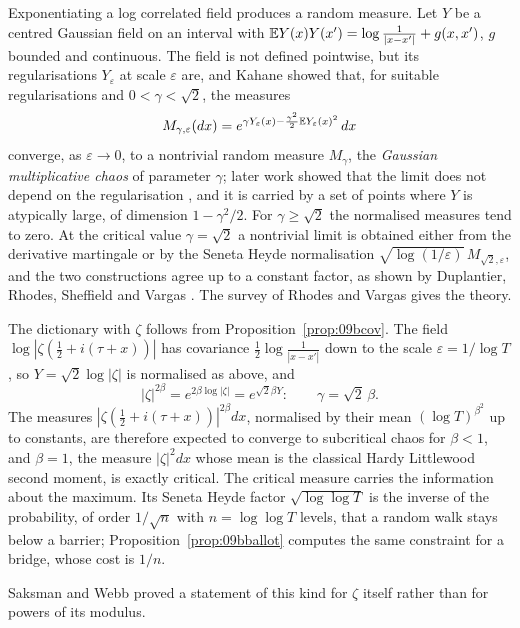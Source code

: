 Exponentiating a log correlated field produces a random measure. Let $Y$ be a centred Gaussian field on an interval with $\mathbb{E} Y(x)Y(x')=\log\frac{1}{|x-x'|}+g(x,x')$, $g$ bounded and continuous. The field is not defined pointwise, but its regularisations $Y_\varepsilon$ at scale $\varepsilon$ are, and Kahane \cite{kahane1985} showed that, for suitable regularisations and $0<\gamma<\sqrt2$, the measures
\[
M_{\gamma,\varepsilon}(dx)=e^{\gamma Y_\varepsilon(x)-\frac{\gamma^2}2\mathbb{E} Y_\varepsilon(x)^2}\,dx
\]
converge, as $\varepsilon\to0$, to a nontrivial random measure $M_\gamma$, the \emph{Gaussian multiplicative chaos} of parameter $\gamma$; later work showed that the limit does not depend on the regularisation \cite{rhodesvargas2014}, and it is carried by a set of points where $Y$ is atypically large, of dimension $1-\gamma^2/2$. For $\gamma\ge\sqrt2$ the normalised measures tend to zero. At the critical value $\gamma=\sqrt2$ a nontrivial limit is obtained either from the derivative martingale or by the Seneta Heyde normalisation $\sqrt{\log(1/\varepsilon)}\,M_{\sqrt2,\varepsilon}$, and the two constructions agree up to a constant factor, as shown by Duplantier, Rhodes, Sheffield and Vargas \cite{dsrv2014,dsrv2014b}. The survey of Rhodes and Vargas \cite{rhodesvargas2014} gives the theory.

The dictionary with $\zeta$ follows from Proposition~\ref{prop:09bcov}. The field $\log|\zeta(\frac12+i(\tau+x))|$ has covariance $\frac12\log\frac1{|x-x'|}$ down to the scale $\varepsilon=1/\log T$, so $Y=\sqrt2\log|\zeta|$ is normalised as above, and
\[
|\zeta|^{2\beta}=e^{2\beta\log|\zeta|}=e^{\sqrt2\beta Y}:\qquad\gamma=\sqrt2\,\beta .
\]
The measures $|\zeta(\frac12+i(\tau+x))|^{2\beta}dx$, normalised by their mean $(\log T)^{\beta^2}$ up to constants, are therefore expected to converge to subcritical chaos for $\beta<1$, and $\beta=1$, the measure $|\zeta|^2dx$ whose mean is the classical Hardy Littlewood second moment, is exactly critical. The critical measure carries the information about the maximum. Its Seneta Heyde factor $\sqrt{\log\log T}$ is the inverse of the probability, of order $1/\sqrt n$ with $n=\log\log T$ levels, that a random walk stays below a barrier; Proposition~\ref{prop:09bballot} computes the same constraint for a bridge, whose cost is $1/n$.

Saksman and Webb proved a statement of this kind for $\zeta$ itself rather than for powers of its modulus.

